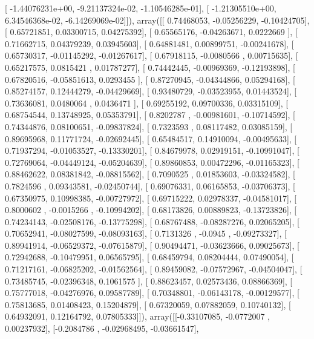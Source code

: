 \documentclass{article}
\begin{document}
       [ -1.44076231e+00,  -9.21137324e-02,  -1.10546285e-01],
       [ -1.21305510e+00,   6.34546368e-02,  -6.14269069e-02]]), array([[ 0.74468053, -0.05256229, -0.10424705],
       [ 0.65721851,  0.03300715,  0.04275392],
       [ 0.65565176, -0.04263671,  0.0222669 ],
       [ 0.71662715,  0.04379239,  0.03945603],
       [ 0.64881481,  0.00899751, -0.00241678],
       [ 0.65730317, -0.01145292, -0.01267617],
       [ 0.67918115, -0.0080566 ,  0.00715635],
       [ 0.65217575,  0.0815421 ,  0.01787277],
       [ 0.74442445, -0.00969369, -0.12193898],
       [ 0.67820516, -0.05851613,  0.0293455 ],
       [ 0.87270945, -0.04344866,  0.05294168],
       [ 0.85274157,  0.12444279, -0.04429669],
       [ 0.93480729, -0.03523955,  0.01443524],
       [ 0.73636081,  0.0480064 ,  0.0436471 ],
       [ 0.69255192,  0.09700336,  0.03315109],
       [ 0.68754544,  0.13748925,  0.05353791],
       [ 0.8202787 , -0.00981601, -0.10714592],
       [ 0.74344876,  0.08100651, -0.09837824],
       [ 0.7323593 ,  0.08117482,  0.03085159],
       [ 0.89695968,  0.11771724, -0.02692445],
       [ 0.65484517,  0.14910094, -0.00495633],
       [ 0.71937294, -0.01053527, -0.13330201],
       [ 0.84679978,  0.02919151, -0.10991047],
       [ 0.72769064, -0.04449124, -0.05204639],
       [ 0.89860853,  0.00472296, -0.01165323],
       [ 0.88462622,  0.08381842, -0.08815562],
       [ 0.7090525 ,  0.01853603, -0.03324582],
       [ 0.7824596 ,  0.09343581, -0.02450744],
       [ 0.69076331,  0.06165853, -0.03706373],
       [ 0.67350975,  0.10998385, -0.00727972],
       [ 0.69715222,  0.02978337, -0.04581017],
       [ 0.8000602 , -0.0015266 , -0.10994202],
       [ 0.68173826,  0.00889823, -0.13723826],
       [ 0.74234143, -0.02508176, -0.13775298],
       [ 0.68767488, -0.08287276,  0.02065205],
       [ 0.70652941, -0.08027599, -0.08093163],
       [ 0.7131326 , -0.0945    , -0.09273327],
       [ 0.89941914, -0.06529372, -0.07615879],
       [ 0.90494471, -0.03623666,  0.09025673],
       [ 0.72942688, -0.10479951,  0.06565795],
       [ 0.68459794,  0.08204444,  0.07490054],
       [ 0.71217161, -0.06825202, -0.01562564],
       [ 0.89459082, -0.07572967, -0.04504047],
       [ 0.73485745, -0.02396348,  0.1061575 ],
       [ 0.88623457,  0.02573436,  0.08866369],
       [ 0.75777018, -0.04276976,  0.09587789],
       [ 0.70348801, -0.06143178, -0.00129577],
       [ 0.75813685,  0.01408423,  0.15204879],
       [ 0.67320059,  0.07882059,  0.10740132],
       [ 0.64932091,  0.12164792,  0.07805333]]), array([[-0.33107085, -0.0772007 ,  0.00237932],
       [-0.2084786 , -0.02968495, -0.03661547],
\end{document}
